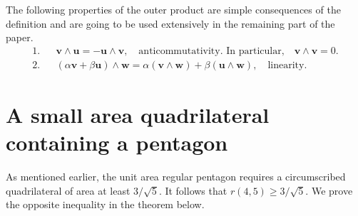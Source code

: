 \documentclass [10pt,oneside]{amsart}
\theoremstyle{definition}
\theoremstyle{plain}
\begin{document}
The following properties of the outer product are simple
consequences of the definition and are going to be used extensively
in the remaining part of the paper.
\begin{eqnarray*}
1.&& \mathbf{v}\wedge \mathbf{u} =- \mathbf{u}\wedge\mathbf{v},\quad \text{
anticommutativity. In particular,} \quad \mathbf{v}\wedge\mathbf{v}=0.\\
2.&& (\alpha \mathbf{v}+\beta \mathbf{u})\wedge \mathbf{w}=\alpha (\mathbf{v}\wedge\mathbf{w})
+\beta(\mathbf{u}\wedge\mathbf{w}), \quad \text{linearity}.
\end{eqnarray*}

\section{\bf A small area quadrilateral containing a pentagon}
As mentioned earlier, the unit area regular pentagon requires a circumscribed quadrilateral of area at least $3/\sqrt{5}$. It follows that $r(4,5)\ge 3/\sqrt{5}$. We prove the opposite inequality in the theorem below.
\end{document}
